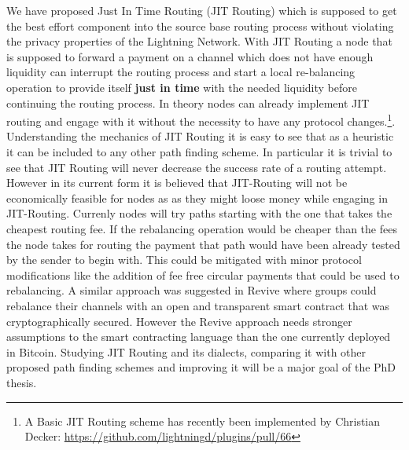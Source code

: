 \documentclass[a4paper]{paper}
\begin{document}
We have proposed Just In Time Routing (JIT Routing) \cite{pickhardt2019jit} which is supposed to get the best effort component into the source base routing process without violating the privacy properties of the Lightning Network.
With JIT Routing a node that is supposed to forward a payment on a channel which does not have enough liquidity can interrupt the routing process and start a local re-balancing operation to provide itself \textbf{just in time} with the needed liquidity before continuing the routing process.
In theory nodes can already implement JIT routing and engage with it without the necessity to have any protocol changes.\footnote{A Basic JIT Routing scheme has recently been implemented by Christian Decker: \url{https://github.com/lightningd/plugins/pull/66}}.
Understanding the mechanics of JIT Routing it is easy to see that as a heuristic it can be included to any other path finding scheme.
In particular it is trivial to see that JIT Routing will never decrease the success rate of a routing attempt.
However in its current form it is believed that JIT-Routing will not be economically feasible for nodes as as they might loose money while engaging in JIT-Routing.
Currenly nodes will try paths starting with the one that takes the cheapest routing fee.
If the rebalancing operation would be cheaper than the fees the node takes for routing the payment that path would have been already tested by the sender to begin with.
This could be mitigated with minor protocol modifications like the addition of fee free circular payments that could be used to rebalancing.
A similar approach was suggested in Revive \cite{khalil2017revive} where groups could rebalance their channels with an open and transparent smart contract that was cryptographically secured.
However the Revive approach needs stronger assumptions to the smart contracting language than the one currently deployed in Bitcoin.
Studying JIT Routing and its dialects, comparing it with other proposed path finding schemes and improving it will be a major goal of the PhD thesis. 
\end{document}
